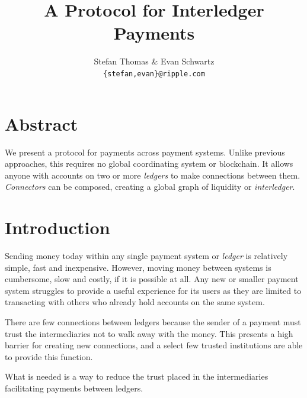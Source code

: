 \documentclass[letterpaper,twocolumn,10pt]{article}
\begin{document}
\date{}

\title{\Large \bf A Protocol for Interledger Payments}

\author{
\textnormal{Stefan Thomas \& Evan Schwartz} \\
\textnormal{\texttt{\{stefan,evan\}@ripple.com}}
}

\maketitle

\thispagestyle{empty}

\section*{Abstract}

We present a protocol for payments across payment systems. Unlike previous approaches, this requires no global coordinating system or blockchain. It allows anyone with accounts on two or more \textit{ledgers} to make connections between them. \textit{Connectors} can be composed, creating a global graph of liquidity or \mbox{\textit{interledger}}.


\section{Introduction}


Sending money today within any single payment system or \textit{ledger} is relatively simple, fast and inexpensive. However, moving money between systems is cumbersome, slow and costly, if it is possible at all. Any new or smaller payment system struggles to provide a useful experience for its users as they are limited to transacting with others who already hold accounts on the same system.

There are few connections between ledgers because the sender of a payment must trust the intermediaries not to walk away with the money. This presents a high barrier for creating new connections, and a select few trusted institutions are able to provide this function.

What is needed is a way to reduce the trust placed in the intermediaries facilitating payments between ledgers.
\end{document}
